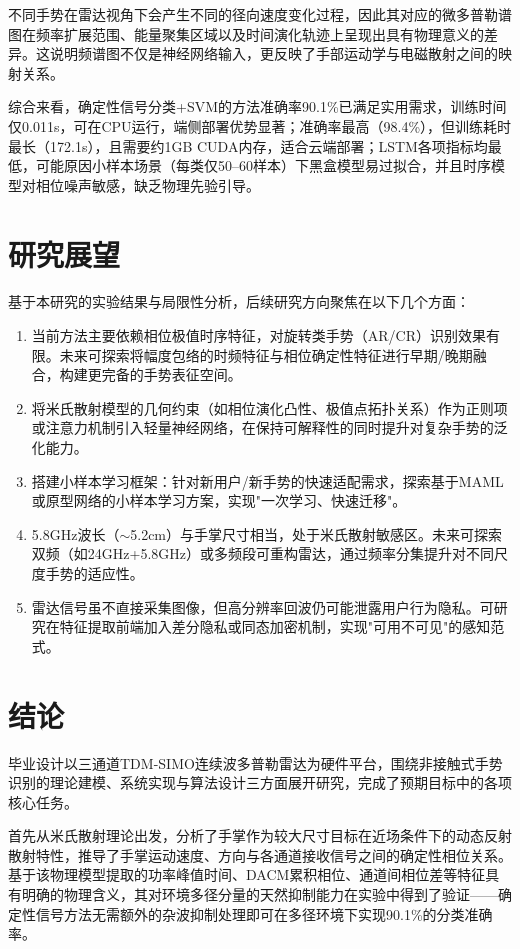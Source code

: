 不同手势在雷达视角下会产生不同的径向速度变化过程，因此其对应的微多普勒谱图在频率扩展范围、能量聚集区域以及时间演化轨迹上呈现出具有物理意义的差异。这说明频谱图不仅是神经网络输入，更反映了手部运动学与电磁散射之间的映射关系。

综合来看，确定性信号分类+SVM的方法准确率90.1\%已满足实用需求，训练时间仅0.011s，可在CPU运行，端侧部署优势显著；准确率最高（98.4\%），但训练耗时最长（172.1s），且需要约1GB CUDA内存，适合云端部署；LSTM各项指标均最低，可能原因小样本场景（每类仅50--60样本）下黑盒模型易过拟合，并且时序模型对相位噪声敏感，缺乏物理先验引导。

\section{研究展望}

基于本研究的实验结果与局限性分析，后续研究方向聚焦在以下几个方面：

\begin{enumerate}[itemsep=0pt, parsep=0pt, topsep=0pt, partopsep=0pt]
    \item 当前方法主要依赖相位极值时序特征，对旋转类手势（AR/CR）识别效果有限。未来可探索将幅度包络的时频特征与相位确定性特征进行早期/晚期融合，构建更完备的手势表征空间。
    \item 将米氏散射模型的几何约束（如相位演化凸性、极值点拓扑关系）作为正则项或注意力机制引入轻量神经网络，在保持可解释性的同时提升对复杂手势的泛化能力。
    \item 搭建小样本学习框架：针对新用户/新手势的快速适配需求，探索基于MAML或原型网络的小样本学习方案，实现"一次学习、快速迁移"。
    \item 5.8GHz波长（$\sim$5.2cm）与手掌尺寸相当，处于米氏散射敏感区。未来可探索双频（如24GHz+5.8GHz）或多频段可重构雷达，通过频率分集提升对不同尺度手势的适应性。
    \item 雷达信号虽不直接采集图像，但高分辨率回波仍可能泄露用户行为隐私。可研究在特征提取前端加入差分隐私或同态加密机制，实现"可用不可见"的感知范式。
\end{enumerate}

\section{结论}

毕业设计以三通道TDM-SIMO连续波多普勒雷达为硬件平台，围绕非接触式手势识别的理论建模、系统实现与算法设计三方面展开研究，完成了预期目标中的各项核心任务。

首先从米氏散射理论出发，分析了手掌作为较大尺寸目标在近场条件下的动态反射散射特性，推导了手掌运动速度、方向与各通道接收信号之间的确定性相位关系。基于该物理模型提取的功率峰值时间、DACM累积相位、通道间相位差等特征具有明确的物理含义，其对环境多径分量的天然抑制能力在实验中得到了验证——确定性信号方法无需额外的杂波抑制处理即可在多径环境下实现90.1\%的分类准确率。

